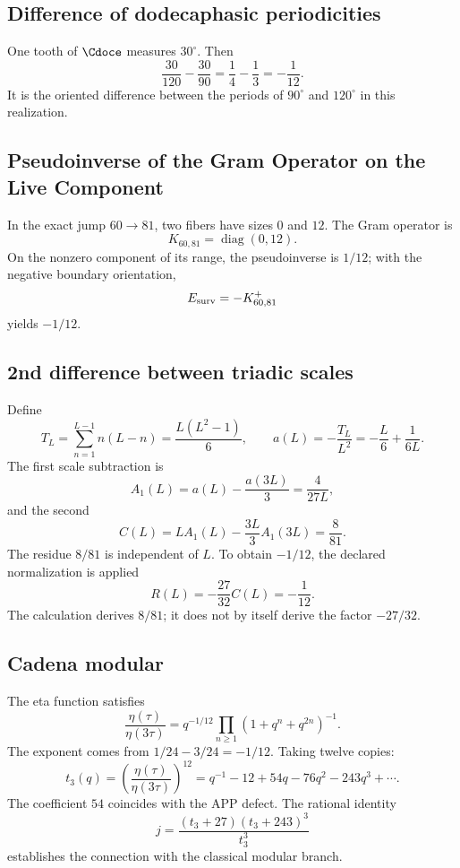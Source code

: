 \subsection{Difference of dodecaphasic periodicities}

One tooth of \(\Cdoce\) measures \(30^\circ\). Then
\[
\frac{30}{120}-\frac{30}{90}
=\frac14-\frac13
=-\frac1{12}.
\]
It is the oriented difference between the periods of \(90^\circ\) and
\(120^\circ\) in this realization.

\subsection{Pseudoinverse of the Gram Operator on the Live Component}

In the exact jump \(60\to81\), two fibers have sizes \(0\) and
\(12\). The Gram operator is
\[
K_{60,81}=\operatorname{diag}(0,12).
\]
On the nonzero component of its range, the pseudoinverse is \(1/12\); with the negative
boundary orientation,
\[
E_{\rm surv}=-K_{60,81}^{+}
\]
yields \(-1/12\).

\subsection{2nd difference between triadic scales}
\label{sec:c27-segunda-diferencia-triadica}

Define
\[
T_L=\sum_{n=1}^{L-1}n(L-n)=\frac{L(L^2-1)}6,
\qquad
a(L)=-\frac{T_L}{L^2}=-\frac L6+\frac1{6L}.
\]
The first scale subtraction is
\[
A_1(L)=a(L)-\frac{a(3L)}3=\frac4{27L},
\]
and the second
\[
C(L)=LA_1(L)-\frac{3L}{3}A_1(3L)=\frac8{81}.
\]
The residue \(8/81\) is independent of \(L\). To obtain
\(-1/12\), the declared normalization is applied
\[
R(L)=-\frac{27}{32}C(L)=-\frac1{12}.
\]
The calculation derives \(8/81\); it does not by itself derive the factor \(-27/32\).

\subsection{Cadena modular}

The eta function satisfies
\[
\frac{\eta(\tau)}{\eta(3\tau)}
=q^{-1/12}\prod_{n\ge1}(1+q^n+q^{2n})^{-1}.
\]
The exponent comes from \(1/24-3/24=-1/12\). Taking twelve copies:
\[
t_3(q)=\left(\frac{\eta(\tau)}{\eta(3\tau)}\right)^{12}
=q^{-1}-12+54q-76q^2-243q^3+\cdots.
\]
The coefficient \(54\) coincides with the APP defect\@. The rational identity
\[
j=\frac{(t_3+27)(t_3+243)^3}{t_3^3}
\]
establishes the connection with the classical modular branch.

